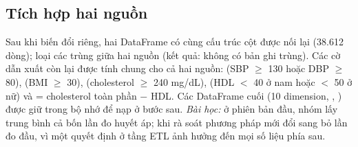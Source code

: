 \subsection{Tích hợp hai nguồn}
Sau khi biến đổi riêng, hai DataFrame có cùng cấu trúc cột được nối lại (38.612 dòng); loại các  trùng giữa hai nguồn (kết quả: không có bản ghi trùng). Các cờ dẫn xuất còn lại được tính chung cho cả hai nguồn:  (SBP $\geq$ 130 hoặc DBP $\geq$ 80),  (BMI $\geq$ 30),  (cholesterol $\geq$ 240 mg/dL),  (HDL $<$ 40 ở nam hoặc $<$ 50 ở nữ) và  = cholesterol toàn phần $-$ HDL. Các DataFrame cuối (10 dimension, , ) được giữ trong bộ nhớ để nạp ở bước sau. \emph{Bài học:} ở phiên bản đầu, nhóm lấy trung bình cả bốn lần đo huyết áp; khi rà soát phương pháp mới đổi sang bỏ lần đo đầu, vì một quyết định ở tầng ETL ảnh hưởng đến mọi số liệu phía sau.

